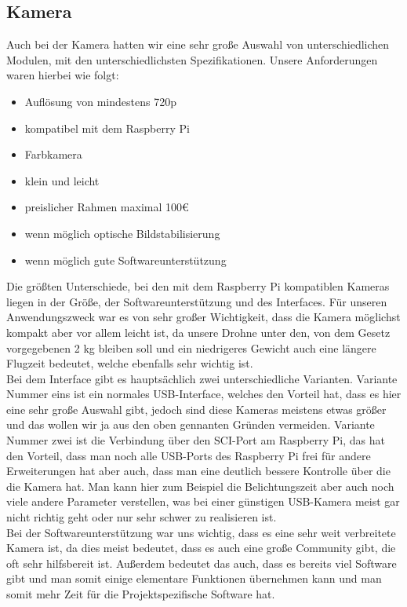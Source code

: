 \subsection{Kamera}\label{kamera}
Auch bei der Kamera hatten wir eine sehr große Auswahl von unterschiedlichen Modulen, mit den unterschiedlichsten Spezifikationen. Unsere Anforderungen waren hierbei  wie folgt:
\begin{itemize}
	\item Auflösung von mindestens 720p
	\item kompatibel mit dem Raspberry Pi
	\item Farbkamera
	\item klein und leicht
	\item preislicher Rahmen maximal 100€
	\item wenn möglich optische Bildstabilisierung
	\item wenn möglich gute Softwareunterstützung
\end{itemize}
Die größten Unterschiede, bei den mit dem Raspberry Pi kompatiblen Kameras liegen in der Größe, der Softwareunterstützung und des Interfaces. Für unseren Anwendungszweck war es von sehr großer Wichtigkeit, dass die Kamera möglichst kompakt aber vor allem leicht ist, da unsere Drohne unter den, von dem Gesetz vorgegebenen 2 kg bleiben soll und ein niedrigeres Gewicht auch eine längere Flugzeit bedeutet, welche ebenfalls sehr wichtig ist.\\
Bei dem Interface gibt es hauptsächlich zwei unterschiedliche Varianten. Variante Nummer eins ist ein normales USB-Interface, welches den Vorteil hat, dass es hier eine sehr große Auswahl gibt, jedoch sind diese Kameras meistens etwas größer und das wollen wir ja aus den oben gennanten Gründen vermeiden. Variante Nummer zwei ist die Verbindung über den SCI-Port am Raspberry Pi, das hat den Vorteil, dass man noch alle USB-Ports des Raspberry Pi frei für andere Erweiterungen hat aber auch, dass man eine deutlich bessere Kontrolle über die die Kamera hat. Man kann hier zum Beispiel die Belichtungszeit aber auch noch viele andere Parameter verstellen, was bei einer günstigen USB-Kamera meist gar nicht richtig geht oder nur sehr schwer zu realisieren ist.\\
Bei der Softwareunterstützung war uns wichtig, dass es eine sehr weit verbreitete Kamera ist, da dies meist bedeutet, dass es auch eine große Community gibt, die oft sehr hilfsbereit ist. Außerdem bedeutet das auch, dass es bereits viel Software gibt und man somit einige elementare Funktionen übernehmen kann und man somit mehr Zeit für die Projektspezifische Software hat.\\

